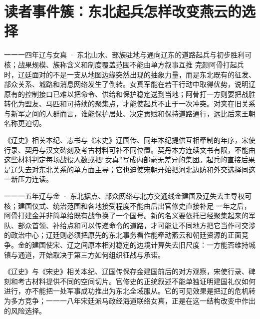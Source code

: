 \section{读者事件簇：东北起兵怎样改变燕云的选择}

\begin{event}{}{一一一四年}{辽与女真 · 东北山水、部族驻地与通向辽东的道路}{起兵与初步胜利可核；战果规模、族称含义和制度覆盖范围不能由单方叙事互推}
完颜阿骨打起兵时，辽廷面对的不是一支从地图边缘突然出现的抽象力量，而是东北既有的征发、部众关系、城路和消息网络发生了倒转。女真军能在若干行动中取得优势，说明辽原有的控制接口已难以把命令、供给和保护稳定送到当地；阿骨打一方则要把战胜转化为盟友、马匹和可持续的聚集点，才能使起兵不止于一次冲突。对夹在旧关系与新军之间的人群而言，谁能保护居处、决定贡赋和保持道路通行，远比后来王朝名称更迫切。

《辽史》相关本纪、志书与《宋史》辽国传、同年本纪提供互相牵制的年序，宋使行录、契丹与汉文碑刻及考古材料可补不同位置。契丹本方连续文书有限，不能由这些材料判定每场战役人数或把“女真”写成内部毫无差异的集团。起兵的直接后果是辽失去对东北关系的单方面主导；它也迫使宋朝开始把河北边防和外交选择同这一新压力连读。
\end{event}

\begin{event}{}{一一一五年}{辽与金 · 东北据点、部众网络与北方交通线}{金建国及辽失去主导权可核；建国仪式、统治范围和各地接受程度不能由后出官修史直接补足}
一年之后，阿骨打建金并非简单给既有战争换了一个国号。新的名义要依托已经聚集起来的军队、部众首领、补给点和可以传递命令的道路，才可能让不同地方把它当作可交涉的政治中心；辽廷则必须把原先的东北事务看作能牵动燕云和朝廷资源的正面竞争。金的建国使宋、辽之间原本相对稳定的边境计算失去旧尺度：一方能否维持城镇与通道，开始取决于第三方如何组织征战与承诺。

《辽史》与《宋史》相关本纪、辽国传保存金建国前后的对方观察，宋使行录、碑刻和考古材料提供不同的空间切片。官修史的正统叙述不能单独证明建国礼仪如何进行，亦不能把一处军事成功推出为东北全域服从。它的可见效果是把辽的危机转为多方竞争；一一一八年宋廷派马政经海道联络女真，正是在这一结构改变中作出的风险选择。
\end{event}


